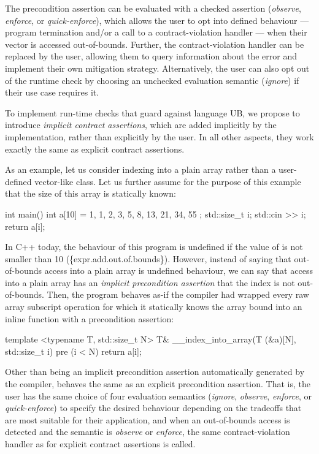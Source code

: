 The precondition assertion  can be evaluated with a checked assertion  (\emph{observe}, \emph{enforce}, or \emph{quick-enforce}), which allows the user to opt into defined behaviour --- program termination and/or a call to a contract-violation handler --- when their vector is accessed out-of-bounds. Further, the contract-violation handler can be replaced by the user, allowing them to query information about the error and implement their own mitigation strategy. Alternatively, the user can also opt out of the runtime check by choosing an unchecked evaluation semantic (\emph{ignore}) if their use case requires it. 

To implement run-time checks that guard against language UB, we propose to introduce \emph{implicit contract assertions}, which are added implicitly by the implementation, rather than explicitly by the user. In all other aspects, they work exactly the same as explicit contract assertions.

As an example, let us consider indexing into a plain array rather than a user-defined vector-like class. Let us further assume for the purpose of this example that the size  of this array is statically known:

\begin{codeblock}
int main() {
  int a[10] = { 1, 1, 2, 3, 5, 8, 13, 21, 34, 55 };
  std::size_t i; 
  std::cin >> i;
  return a[i];
}
\end{codeblock}

In C++ today, the behaviour of this program is undefined if the value of  is not smaller than 10 (\{expr.add.out.of.bounds\}). However, instead of saying that out-of-bounds access into a plain array is undefined behaviour, we can say that access into a plain array has an \emph{implicit precondition assertion} that the index is not out-of-bounds. Then, the program behaves as-if the compiler had wrapped every raw array subscript operation for which it statically knows the array bound  into an inline function with a precondition assertion:

\begin{codeblock}
template <typename T, std::size_t N>
T& __index_into_array(T (&a)[N], std::size_t i)
pre (i < N) {
  return a[i];
}
\end{codeblock}

Other than being an implicit precondition assertion automatically generated by the compiler,  behaves the same as an explicit precondition assertion. That is, the user has the same choice of four evaluation semantics (\emph{ignore}, \emph{observe}, \emph{enforce}, or \emph{quick-enforce}) to specify the desired behaviour depending on the tradeoffs that are most suitable for their application, and when an out-of-bounds access is detected and the semantic is \emph{observe} or \emph{enforce}, the same contract-violation handler as for explicit contract assertions is called.

